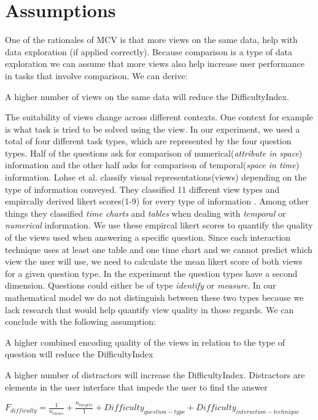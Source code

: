 \section{Assumptions}
One of the rationales of MCV is that more views on the same data, help with data exploration (if applied correctly).
Because comparison is a type of data exploration we can assume that more views also help increase user performance in tasks
that involve comparison. We can derive:
\begin{statements}
    \item A higher number of views on the same data will reduce the DifficultyIndex.
\end{statements}
The suitability of views change across different contexts. One context for example is what task is tried to be solved
using the view. In our experiment, we used a total of four different task types, which are represented by the four question
types. Half of the questions ask for comparison of numerical(\textit{attribute in space}) information and the other half
asks for comparison of temporal(\textit{space in time}) information. Lohse et al. classify visual representations(views)
depending on the type of information conveyed. They classified 11 different view types and empircally derived likert
scores(1-9) for every type of information \citep*{Lohse.1994}. Among other things they classified \textit{time charts} and 
\textit{tables} when dealing with \textit{temporal} or \textit{numerical} information. We use these empircal likert scores
to quantify the quality of the views used when answering a specific question. Since each interaction technique uses at least
one table and one time chart and we cannot predict which view the user will use, we need to calculate the mean likert score
of both views for a given question type. In the experiment the question types have a second dimension. Questions could
either be of type \textit{identify} or \textit{measure}. In our mathematical model we do not distinguish between these
two types because we lack research that would help quantify view quality in those regards. We can conclude with the
following assumption:
\begin{statements}[resume]
    \item A higher combined encoding quality of the views in relation to the type of question will reduce the
    DifficultyIndex
\end{statements}
\begin{statements}[resume]
    \item A higher number of distractors will increase the DifficultyIndex. Distractors are elements in the user interface
    that impede the user to find the answer
\end{statements}

$
F_{difficulty} = \frac{1}{n_{views}} + \frac{n_{targets}}{1} + Difficulty_{question-type} + Difficulty_{interaction-technique}
$